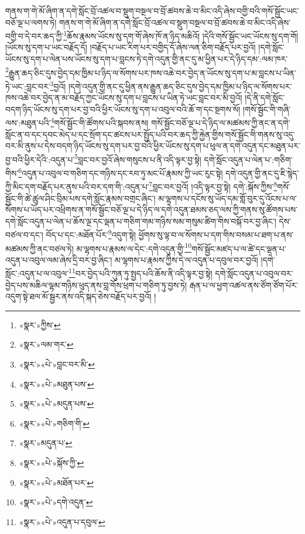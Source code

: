 གནས་ག་གེ་མོ་ཞིག་ན་དགེ་སློང་བྲོ་འཚལ་བ་སྡུག་བསྔལ་བ་བྲོ་ཚབས་ཆེ་བ་མིང་འདི་ཞེས་བགྱི་བའི་གསོ་སྦྱོང་ཡང་བཅོ་ལྔ་པ་ལགས་ཏེ། གནས་ག་གེ་མོ་ཞིག་ན་དགེ་སློང་བྲོ་འཚལ་བ་སྡུག་བསྔལ་བ་བྲོ་ཚབས་ཆེ་བ་མིང་འདི་ཞེས་བགྱི་བ་དེ་བར་ཆད་ཀྱི་\footnote{«སྣར་»ཀྱིས་}ཆོས་རྣམས་ཡོངས་སུ་དག་གོ་ཞེས་ཁོ་ན་ཉིད་མཆིའོ། །དེའི་གསོ་སྦྱོང་ཡང་ཡོངས་སུ་དག་གོ། །ཡོངས་སུ་དག་པ་ཡང་བརྗོད་དོ། །བརྗོད་པ་ཡང་རིག་པར་བགྱིད་དོ་ཞེས་ལན་ཅིག་བརྗོད་པར་བྱའོ། །དགེ་སློང་ཡོངས་སུ་དག་པ་ལེན་པས་ཡོངས་སུ་དག་པ་བླངས་ཏེ་དགེ་འདུན་གྱི་ནང་དུ་མ་ཕྱིན་པར་དེ་ཉིད་དམ་:ལམ་ཁར་\footnote{«སྣར་»ལམ་གར་}རྒྱུན་ཆད་ཅིང་དུས་བྱེད་དམ་ཁྱིམ་པ་ཉིད་ལ་སོགས་པར་ཁས་འཆེ་བར་བྱེད་ན་ཡོངས་སུ་དག་པ་མ་བླངས་པ་ཡིན་ཏེ་ཡང་:བླང་བར་\footnote{«སྣར་»«པེ་»བླང་བར་མི་}བྱའོ། །དགེ་འདུན་གྱི་ནང་དུ་ཕྱིན་ནས་རྒྱུན་ཆད་ཅིང་དུས་བྱེད་དམ་ཁྱིམ་པ་ཉིད་ལ་སོགས་པར་ཁས་འཆེ་བར་བྱེད་ན་མ་བརྗོད་ཀྱང་ཡོངས་སུ་དག་པ་བླངས་པ་ཡིན་ཏེ་ཡང་བླང་བར་མི་བྱའོ། །དེ་ནི་དགེ་སློང་བདག་ཉིད་ཡོངས་སུ་དག་པར་བྱ་བའི་ཕྱིར་ཡོངས་སུ་དག་པ་འབུལ་བའི་ཆོ་ག་དང་སྔགས་སོ། །གསོ་སྦྱོང་གི་གཞི་ལས་:མཐུན་པའི་\footnote{«སྣར་»«པེ་»མཐུན་པས་}གསོ་སྦྱོང་གི་ཚོགས་པའི་སྐབས་ནས། གསོ་སྦྱོང་བཅོ་ལྔ་པ་དེ་ཉིད་ལ་མཚམས་ཀྱི་ནང་ན་དགེ་སློང་ན་བ་དང་དབང་མེད་པ་དང་སྲོག་དང་ཚངས་པར་སྤྱོད་པའི་བར་ཆད་ཀྱི་རྐྱེན་གྱིས་གསོ་སྦྱོང་གི་གནས་སུ་འདུ་བར་མི་ནུས་པ་དེས་བདག་ཉིད་ཡོངས་སུ་དག་པར་བྱ་བའི་ཕྱིར་ཡོངས་སུ་དག་པ་ཕུལ་ན་དགེ་འདུན་དང་མཐུན་པར་བྱ་བའི་ཕྱིར་དེའི་:འདུན་པ་\footnote{«སྣར་»«པེ་»མདུན་པས་}བླང་བར་བྱའོ་ཞེས་གསུངས་པ་ནི་འདི་ལྟར་བྱ་སྟེ། དགེ་སློང་འདུན་པ་ལེན་པ་:གཅིག་གིས་\footnote{«སྣར་»«པེ་»གཅིག་གི་}འདུན་པ་འབུལ་བ་གཅིག་དང་གཉིས་དང་རབ་ཏུ་མང་པོ་རྣམས་ཀྱི་ཡང་རུང་སྟེ། དགེ་འདུན་གྱི་ནང་དུ་ཇི་སྙེད་ཀྱི་མིང་དག་བརྗོད་པར་ནུས་པའི་བར་དག་གི་:འདུན་པ་\footnote{«སྣར་»མདུན་པ་}བླང་བར་བྱའོ། །འདི་ལྟར་བྱ་སྟེ། དགེ་:སྐོས་ཀྱིས་\footnote{«སྣར་»«པེ་»སྐོས་ཀྱི་}གསོ་སྦྱོང་གི་ཚེ་ཚུལ་ཤིང་བྲིམ་པས་དགེ་སློང་རྣམས་བགྲང་ཞིང་། མ་ལྷགས་པ་དངོས་སུ་ཡོད་དམ་གློ་བུར་དུ་འོངས་པ་ལ་སོགས་པ་ཡོད་པར་འཕྲིགས་ན་གསོ་སྦྱོང་བཅོ་ལྔ་པ་དེ་ཉིད་ལ་དགེ་འདུན་ཐམས་ཅད་ལས་ཀྱི་གནས་སུ་ཚོགས་པས་དགེ་སློང་འདུན་པ་ལེན་པ་ཆོས་ལྔ་དང་ལྡན་པ་གཅིག་གམ་གཉིས་སམ་གསུམ་ཚིག་གིས་བསྐོ་བར་བྱ་ཞིང་། དེས་བཙལ་བ་དང་། བོད་པ་དང་:མཐོན་པོར་\footnote{«སྣར་»«པེ་»མཐོན་པར་}འདུག་སྟེ། ཕྱོགས་སུ་ལྟ་བ་ལ་སོགས་པ་དག་གིས་བསམ་པ་ཐག་པ་ནས་མཚམས་ཀྱི་ནང་བཙལ་ཏེ། མ་ལྷགས་པ་རྣམས་ལ་དེང་:དགེ་འདུན་གྱི་\footnote{«སྣར་»«པེ་»དགེ་འདུན་}གསོ་སྦྱོང་མཛད་པ་ལ་ཚེ་དང་ལྡན་པ་འདུན་པ་འབུལ་ལམ་ཞེས་དྲི་བར་བྱ་ཞིང་། མ་ལྷགས་པ་རྣམས་ཀྱིས་དེ་ལ་འདུན་པ་དབུལ་བར་བྱའོ། །དགེ་སློང་:འདུན་པ་ལ་འབུལ་\footnote{«སྣར་»«པེ་»འདུན་པ་དབུལ་}བར་བྱེད་པའི་ཀུན་ཏུ་སྤྱད་པའི་ཆོས་ནི་འདི་ལྟར་བྱ་སྟེ། དགེ་སློང་འདུན་པ་འབུལ་བར་བྱེད་པས་མཆིལ་ལྷམ་གཉིས་ཕུད་ནས་བླ་གོས་ཕྲག་པ་གཅིག་ཏུ་བྱས་ཏེ། རྒན་པ་ལ་ཕྱག་འཚལ་ནས་ཙོག་ཙོག་པོར་འདུག་སྟེ་ཐལ་མོ་སྦྱར་ནས་འདི་སྐད་ཅེས་བརྗོད་པར་བྱའོ། །
